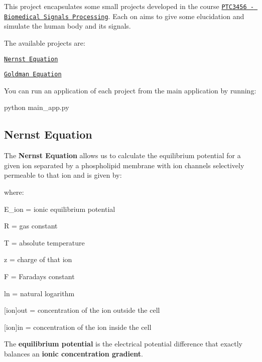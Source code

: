 This project encapsulates some small projects developed in the course \href{https://uspdigital.usp.br/jupiterweb/obterDisciplina?nomdis=&sgldis=PTC3456}{\tt P\+T\+C3456 -\/ Biomedical Signals Processing}. Each on aims to give some elucidation and simulate the human body and its signals.

The available projects are\+:


\begin{DoxyItemize}
\item \href{https://github.com/gabrielriqu3ti/biomedical_signal_processing/wiki/Nernst-Equation}{\tt Nernst Equation}
\item \href{https://github.com/gabrielriqu3ti/biomedical_signal_processing/wiki/Goldman-Equation}{\tt Goldman Equation}
\end{DoxyItemize}

You can run an application of each project from the main application by running\+:


\begin{DoxyCode}
python main\_app.py
\end{DoxyCode}


\subsection*{Nernst Equation}

The {\bfseries Nernst Equation} allows us to calculate the equilibrium potential for a given ion separated by a phospholipid membrane with ion channels selectively permeable to that ion and is given by\+:



where\+:


\begin{DoxyItemize}
\item E\+\_\+ion = ionic equilibrium potential
\item R = gas constant
\item T = absolute temperature
\item z = charge of that ion
\item F = Faraday\textquotesingle{}s constant
\item ln = natural logarithm
\item \mbox{[}ion\mbox{]}out = concentration of the ion outside the cell
\item \mbox{[}ion\mbox{]}in = concentration of the ion inside the cell
\end{DoxyItemize}

The {\bfseries equilibrium potential} is the electrical potential difference that exactly balances an {\bfseries ionic concentration gradient}.

